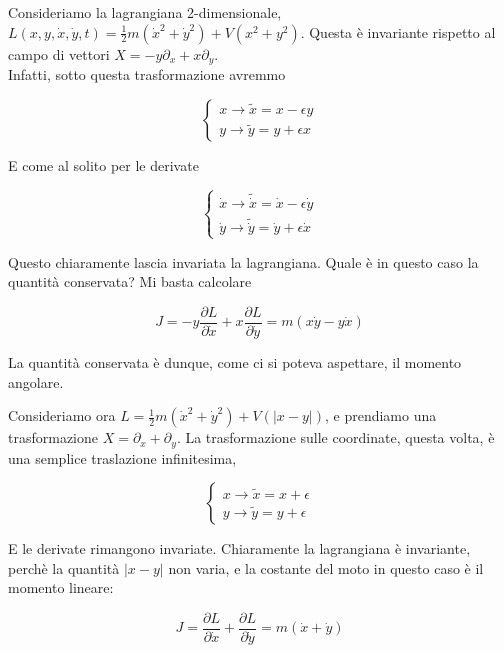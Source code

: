 \documentclass{report}
\begin{document}
\begin{example}
    Consideriamo la lagrangiana 2-dimensionale, $L(x, y, \dot{x}, \dot{y}, t) = \frac{1}{2}m(\dot{x}^2 + \dot{y}^2) + V(x^2 + y^2)$. Questa è invariante rispetto al campo di vettori $X = -y\partial_x + x\partial_y$. \\
    Infatti, sotto questa trasformazione avremmo 

    \[
    \begin{cases}
    x \rightarrow \tilde{x} = x - \epsilon y   \\
    y \rightarrow \tilde{y} = y + \epsilon x
    \end{cases}
    \]

    E come al solito per le derivate 

    \[
    \begin{cases}
    \dot{x} \rightarrow \tilde{\dot{x}} = \dot{x} - \epsilon \dot{y}   \\
    \dot{y} \rightarrow \tilde{\dot{y}} = \dot{y} + \epsilon \dot{x}
    \end{cases}
    \]

    Questo chiaramente lascia invariata la lagrangiana. Quale è in questo caso la quantità conservata? Mi basta calcolare

    \begin{equation}
        J = -y \frac{\partial L}{\partial \dot{x}} + x \frac{\partial L }{\partial \dot{y}} = m(x\dot{y} - y\dot{x}) 
    \end{equation}

    La quantità conservata è dunque, come ci si poteva aspettare, il momento angolare. 
\end{example}

\begin{example}
    Consideriamo ora $L = \frac{1}{2}m(\dot{x}^2 + \dot{y}^2) + V(|x-y|)$, e prendiamo una trasformazione $X = \partial_x + \partial_y$. La trasformazione sulle coordinate, questa volta, è una semplice traslazione infinitesima,

        \[
    \begin{cases}
    x \rightarrow \tilde{x} = x + \epsilon   \\
    y \rightarrow \tilde{y} = y + \epsilon
    \end{cases}
    \]

    E le derivate rimangono invariate. Chiaramente la lagrangiana è invariante, perchè la quantità $|x -y|$ non varia, e la costante del moto in questo caso è il momento lineare: 

    \begin{equation}
        J = \frac{\partial L }{\partial \dot{x}} + {\frac{\partial L }{\partial \dot{y}}} = m(\dot{x}+\dot{y})
    \end{equation}
    
\end{example}
\end{document}
